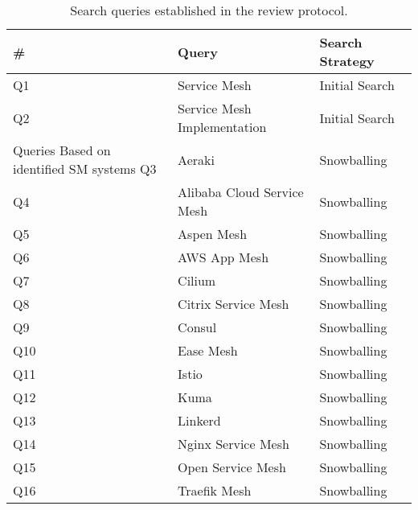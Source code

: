 \begin{table}[t]
\centering
    \begin{tabular}{@{}lll@{}}
    \toprule
    \# & Query & Search Strategy \\
    
    \midrule
    Q1 & Service Mesh & Initial Search \\
    Q2 & Service Mesh Implementation & Initial Search \\

    Queries Based on identified SM systems
    \midrule
    Q3 & Aeraki & Snowballing  \\
    Q4 & Alibaba Cloud Service Mesh & Snowballing \\
    Q5 & Aspen Mesh & Snowballing \\
    Q6 & AWS App Mesh & Snowballing\\
    Q7 & Cilium & Snowballing \\
    Q8 & Citrix Service Mesh & Snowballing \\
    Q9 & Consul & Snowballing \\
    Q10 & Ease Mesh & Snowballing \\
    Q11 & Istio & Snowballing \\
    Q12 & Kuma & Snowballing \\
    Q13 & Linkerd & Snowballing \\
    Q14 & Nginx Service Mesh & Snowballing \\
    Q15 & Open Service Mesh & Snowballing \\
    Q16 & Traefik Mesh & Snowballing
    \bottomrule
    \end{tabular}
\caption{Search queries established in the review protocol.}
\label{tab:search-queries}
\end{table}